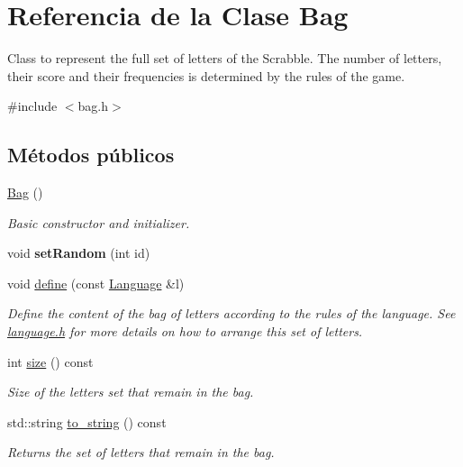\hypertarget{classBag}{}\section{Referencia de la Clase Bag}
\label{classBag}


Class to represent the full set of letters of the Scrabble. The number of letters, their score and their frequencies is determined by the rules of the game.  




{\ttfamily \#include $<$bag.\+h$>$}

\subsection*{Métodos públicos}
\begin{DoxyCompactItemize}
\item 
\mbox{\label{classBag_ae0593c22c7dd8b32cab469af92fb200c}} 
\hyperlink{classBag_ae0593c22c7dd8b32cab469af92fb200c}{Bag} ()
\begin{DoxyCompactList}\small\item\em Basic constructor and initializer. \end{DoxyCompactList}\item 
\mbox{\label{classBag_a749e428f99881d5fa88978a471b13cb7}} 
void {\bfseries set\+Random} (int id)
\item 
void \hyperlink{classBag_ad380d36f2628b3ffe0ca19cfe53d7c19}{define} (const \hyperlink{classLanguage}{Language} \&l)
\begin{DoxyCompactList}\small\item\em Define the content of the bag of letters according to the rules of the language. See \hyperlink{language_8h}{language.\+h} for more details on how to arrange this set of letters. \end{DoxyCompactList}\item 
int \hyperlink{classBag_a32652be363a0f5d189b029ed863e5bf2}{size} () const
\begin{DoxyCompactList}\small\item\em Size of the letters set that remain in the bag. \end{DoxyCompactList}\item 
std\+::string \hyperlink{classBag_ac63bdc8c3ceed6d86db66b9d399764ab}{to\+\_\+string} () const
\begin{DoxyCompactList}\small\item\em Returns the set of letters that remain in the bag. \end{DoxyCompactList}\item 

\end{DoxyCompactItemize}
